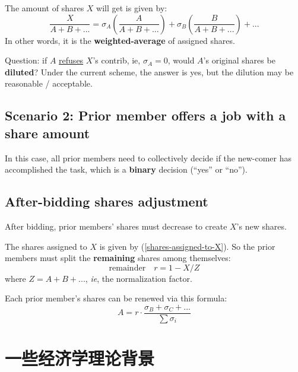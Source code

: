 \documentclass[12pt, orivec]{article}
\newcommand{\cc}[2]{#1}
\newcommand{\cc}[2]{#2}
\begin{document}
The amount of shares $X$ will get is given by:
\begin{equation}
\label{shares-assigned-to-X}
\frac{X}{A + B + ...} = \sigma_A (\frac{A}{A + B + ...}) + \sigma_B (\frac{B}{A + B + ...}) + ...
\end{equation}
In other words, it is the \textbf{weighted-average} of assigned shares.

Question:  if $A$ \uline{refuses} $X$'s contrib, ie, $\sigma_A = 0$, would $A$'s original shares be \textbf{diluted}?  Under the current scheme, the answer is yes, but the dilution may be reasonable / acceptable.

\secttoc
\subsection{Scenario 2:  Prior member offers a job with a share amount}

In this case, all prior members need to collectively decide if the new-comer has accomplished the task, which is a \textbf{binary} decision (``yes'' or ``no'').

\secttoc
\subsection{After-bidding shares adjustment}

After bidding, prior members' shares must decrease to create $X$'s new shares.

The shares assigned to $X$ is given by (\ref{shares-assigned-to-X}).  So the prior members must split the \textbf{remaining} shares among themselves:
\begin{equation}
\boxed{\mbox{remainder}} \quad r = 1 - X / Z
\end{equation}
where $Z = A + B + ...$, \textit{ie}, the normalization factor.

Each prior member's shares can be renewed via this formula:
\begin{equation}
A = r \cdot \frac{\sigma_B + \sigma_C + ...}{\sum \sigma_i}
\end{equation}

\secttoc
\section{\cc{一些经济学理论背景}{Some economic-theoretical background}}
\end{document}
